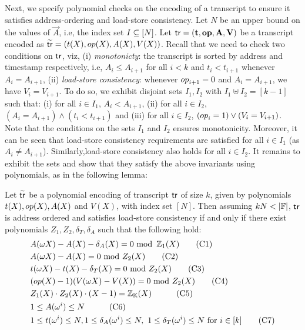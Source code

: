 Next, we specify polynomial checks on the encoding of a transcript to ensure it satisfies address-ordering and load-store consistency.
Let $N$ be an upper bound on the values of $\vec{A}$, i.e, the index set $I\subseteq [N]$.
Let $\mathsf{tr}=(\mathbf{t},\mathbf{{op}},\mathbf{A},\mathbf{V})$ be a transcript encoded as
$\widetilde{\mathsf{tr}}=(t(X),{op}(X),A(X),V(X))$. Recall that we need to check two conditions on $\mathsf{tr}$, viz, (i) {\em monotonicty}:
the transcript is sorted by address and timestamp respectively, i.e, $A_i\leq A_{i+1}$ for all $i < k$ and
$t_i < t_{i+1}$ whenever $A_i=A_{i+1}$, (ii) {\em load-store consistency}: whenever ${op}_{i+1}=0$ and $A_i=A_{i+1}$,
we have $V_i=V_{i+1}$.
To do so, we exhibit disjoint sets $I_1,I_2$ with $I_1\uplus I_2=[k-1]$ such that: (i) for all
$i\in I_1$, $A_i < A_{i+1}$, (ii) for all $i\in I_2$, $(A_i = A_{i+1})\wedge (t_i < t_{i+1})$ and (iii) for all $i\in I_2$,
$({op}_i=1)\vee (V_i = V_{i+1})$.
Note that the conditions on the sets $I_1$ and $I_2$ ensures monotonicity.
Moreover, it can be seen that load-store consistency requirements are satisfied for all $i\in I_1$ (as $A_i\neq A_{i+1}$).
Similarly,load-store consistency also holds for all $i\in I_2$.
It remains to exhibit the sets and show that they satisfy the above invariants using polynomials, as in the following
lemma:
\begin{lemma}\label{lem:addr-ordered-transcript}
Let $\widetilde{\mathsf{tr}}$ be a polynomial encoding of transcript $\mathsf{tr}$ of size $k$, given by polynomials $t(X),{op}(X),A(X)$ and $V(X)$,
with index set $[N]$. Then assuming $kN<|\F|$, $\mathsf{tr}$ is address ordered and satisfies load-store consistency if and only if there exist polynomials
$Z_1,Z_2,\delta_T,\delta_A$
such that the following hold:
\begin{align}%
    & A(\omega X) - A(X) - \delta_A(X)= 0 \text{ mod }\, \mathbb{Z}_1(X) \tag{C1} \label{eq:C1} \\
    & A(\omega X) - A(X) = 0  \text{ mod } Z_2(X) \tag{C2} \label{eq:C2} \\
    & t(\omega X) - t(X) - \delta_T(X) = 0  \text{ mod } Z_2(X) \tag{C3} \label{eq:C3} \\
    & (\op(X) - 1)(V(\omega X) - V(X)) = 0  \text{ mod } Z_2(X) \tag{C4} \label{eq:C4} \\
    & Z_1(X)\cdot Z_2(X)\cdot (X-1) = \mathbb{Z}_\setH(X) \quad  \tag{C5} \label{eq:C5} \\
    & 1\leq A(\omega^i) \leq N  \quad \tag{C6} \label{eq:C6} \\
    & 1\leq t(\omega^i) \leq N, 1\leq \delta_A(\omega^i)\leq N,\ 1\leq \delta_T(\omega^i)\leq N \text{ for } i\in [k] \tag{C7} \label{eq:C7}
\end{align}
\end{lemma}
